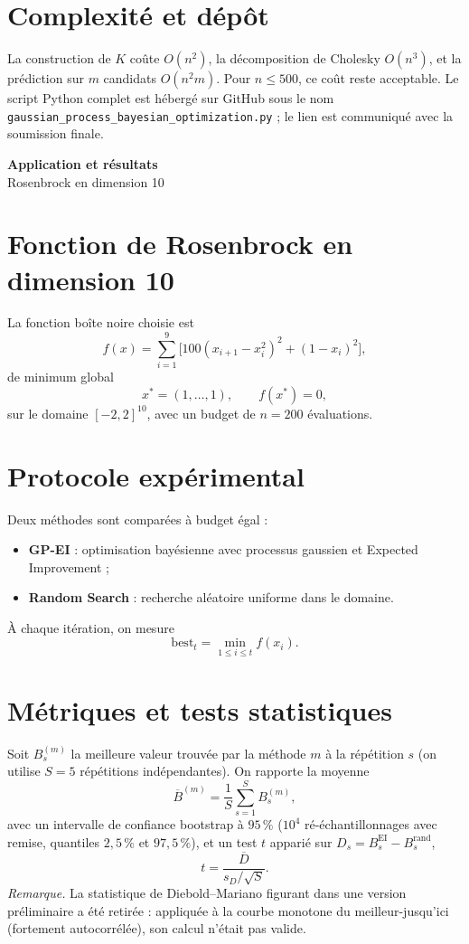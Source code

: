 \documentclass[12pt]{article}
\newcommand{\xs}{x^{*}}
\newcommand{\dividerpage}[2]{%
  \newpage \thispagestyle{empty}
  \vspace*{0.32\textheight}
  \begin{center}
    {\Huge\bfseries #1}\\[14pt]
    {\Large #2}
  \end{center}
  \newpage}
\begin{document}
\section*{Complexité et dépôt}

La construction de $K$ coûte $O(n^2)$, la décomposition de Cholesky $O(n^3)$, et
la prédiction sur $m$ candidats $O(n^2 m)$. Pour $n\le500$, ce coût reste
acceptable. Le script Python complet est hébergé sur GitHub sous le nom
\texttt{gaussian\_process\_bayesian\_optimization.py} ; le lien est communiqué
avec la soumission finale.

\dividerpage{Application et résultats}{Rosenbrock en dimension 10}

\section*{Fonction de Rosenbrock en dimension 10}

La fonction boîte noire choisie est
\[
f(x) = \sum_{i=1}^{9}\bigl[ 100(x_{i+1} - x_i^2)^2 + (1 - x_i)^2 \bigr],
\]
de minimum global
\[
\xs = (1,\dots,1), \qquad f(\xs) = 0,
\]
sur le domaine $[-2,2]^{10}$, avec un budget de $n = 200$ évaluations.

\section*{Protocole expérimental}

Deux méthodes sont comparées à budget égal :
\begin{itemize}
\item \textbf{GP-EI} : optimisation bayésienne avec processus gaussien et Expected Improvement ;
\item \textbf{Random Search} : recherche aléatoire uniforme dans le domaine.
\end{itemize}
À chaque itération, on mesure
\[
\mathrm{best}_t = \min_{1 \le i \le t} f(x_i).
\]

\section*{Métriques et tests statistiques}

Soit $B^{(m)}_s$ la meilleure valeur trouvée par la méthode $m$ à la répétition
$s$ (on utilise $S=5$ répétitions indépendantes). On rapporte la moyenne
\[
\overline{B}^{(m)} = \frac1S \sum_{s=1}^S B^{(m)}_s,
\]
avec un intervalle de confiance bootstrap à $95\,\%$ ($10^4$ ré-échantillonnages
avec remise, quantiles $2{,}5\,\%$ et $97{,}5\,\%$), et un test $t$ apparié sur
$D_s = B^{\text{EI}}_s - B^{\text{rand}}_s$,
\[
t = \frac{\overline{D}}{s_D/\sqrt{S}}.
\]
\emph{Remarque.} La statistique de Diebold--Mariano figurant dans une version
préliminaire a été retirée : appliquée à la courbe monotone du meilleur-jusqu'ici
(fortement autocorrélée), son calcul n'était pas valide.
\end{document}
